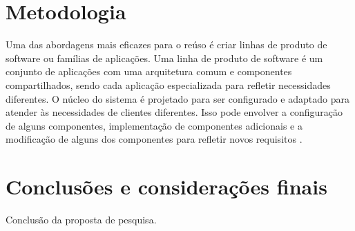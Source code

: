 \documentclass[12pt,a4paper]{article}
\begin{document}
\section{Metodologia}
Uma das abordagens mais eficazes para o reúso é criar linhas de produto de software ou famílias de aplicações. Uma linha de produto de software é um conjunto de aplicações com uma arquitetura comum e componentes compartilhados, sendo cada aplicação especializada para refletir necessidades diferentes. O núcleo do sistema é projetado para ser configurado e adaptado para atender às necessidades de clientes diferentes. Isso pode envolver a configuração de alguns componentes, implementação de componentes adicionais e a modificação de alguns dos componentes para refletir novos requisitos \cite{Sommerville2011}.

\section{Conclusões e considerações finais}
Conclusão da proposta de pesquisa.

\newpage


\end{document}
